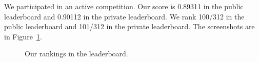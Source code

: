 \documentclass[11pt]{article}
\numberwithin{equation}{section}
\begin{document}
We participated in an active competition.
Our score is 0.89311 in the public leaderboard and 0.90112 in the private leaderboard.
We rank 100/312 in the public leaderboard and 101/312 in the private leaderboard.
The screenshots are in Figure~\ref{fig:leaderboard}.





\begin{figure}
	\begin{center}
	\end{center}
	\caption{Our rankings in the leaderboard.}
	\label{fig:leaderboard}
\end{figure}



%



\end{document}
